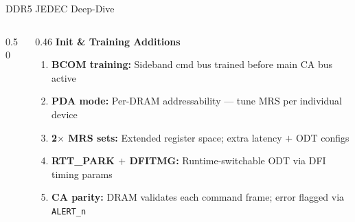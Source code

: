\documentclass[aspectratio=169,10pt]{beamer}
\begin{document}
\begin{frame}{DDR5 JEDEC Deep-Dive}
\begin{columns}[T]
\begin{column}{0.50\textwidth}
{}
    \end{column}

    \begin{column}{0.46\textwidth}
      {\small\textbf{\color{ddrgold}Init \& Training Additions}}\\[6pt]
      {\footnotesize
      \begin{enumerate}\setlength\itemsep{5pt}
        \item \textbf{BCOM training:} Sideband cmd bus trained before main CA bus active
        \item \textbf{PDA mode:} Per-DRAM addressability --- tune MRS per individual device
        \item \textbf{2$\times$ MRS sets:} Extended register space; extra latency $+$ ODT configs
        \item \textbf{RTT\_PARK $+$ DFITMG:} Runtime-switchable ODT via DFI timing params
        \item \textbf{CA parity:} DRAM validates each command frame; error flagged via \texttt{ALERT\_n}
      \end{enumerate}}
    \end{column}

  \end{columns}
\end{frame}
\end{document}
